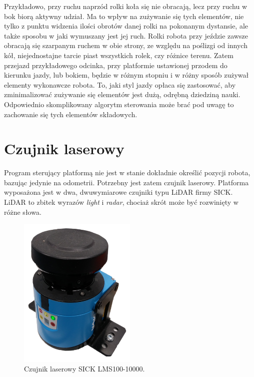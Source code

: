 	Przykładowo, przy ruchu naprzód rolki koła się nie obracają, lecz przy ruchu w bok biorą aktywny udział.
	Ma to wpływ na zużywanie się tych elementów, nie tylko z punktu widzenia ilości obrotów danej rolki na pokonanym dystansie, 
	ale także sposobu w jaki wymuszany jest jej ruch.
	Rolki robota przy jeździe zawsze obracają się szarpanym ruchem w obie strony, ze względu na poślizgi od innych kół, 
	niejednostajne tarcie piast wszystkich rolek, czy różnice terenu. 
	Zatem przejazd przykładowego odcinka, przy platformie ustawionej przodem do kierunku jazdy, lub bokiem, będzie w różnym stopniu i w różny sposób zużywał elementy wykonawcze robota.
	To, jaki styl jazdy opłaca się zastosować, aby zminimalizować zużywanie się elementów jest dużą, odrębną dziedziną nauki.
	Odpowiednio skomplikowany algorytm sterowania może brać pod uwagę to zachowanie się tych elementów składowych.

\section{Czujnik laserowy}
	\label{sec:lidar}
	Program sterujący platformą nie jest w stanie dokładnie określić pozycji robota, bazując jedynie na odometrii.
	Potrzebny jest zatem czujnik laserowy.
	Platforma wyposażona jest w dwa, dwuwymiarowe czujniki typu LiDAR firmy SICK.
	LiDAR to zbitek wyrazów \emph{light} i \emph{radar}, chociaż skrót może być rozwinięty w różne słowa.

	\begin{figure}[H]
	\centering
	\includegraphics[width=0.5\textwidth]{graphics/sensor.png}
	\caption{Czujnik laserowy SICK LMS100-10000.}
	\label{fig:sensor}
	\end{figure} 


